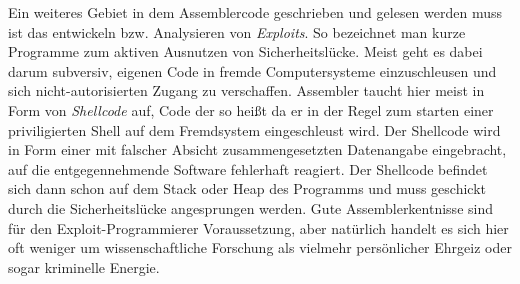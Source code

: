 Ein weiteres Gebiet in dem Assemblercode geschrieben und gelesen werden muss ist das entwickeln bzw. Analysieren von \emph{Exploits}. So bezeichnet man kurze Programme zum aktiven Ausnutzen von Sicherheitslücke. Meist geht es dabei darum subversiv, eigenen Code in fremde Computersysteme einzuschleusen und sich nicht-autorisierten Zugang zu verschaffen. Assembler taucht hier meist in Form von \emph{Shellcode} auf, Code der so heißt da er in der Regel zum starten einer priviligierten Shell auf dem Fremdsystem eingeschleust wird. Der Shellcode wird in Form einer mit falscher Absicht zusammengesetzten Datenangabe eingebracht, auf die entgegennehmende Software fehlerhaft reagiert. Der Shellcode befindet sich dann schon auf dem Stack oder Heap des Programms und muss geschickt durch die Sicherheitslücke angesprungen werden. Gute Assemblerkentnisse sind für den Exploit-Programmierer Voraussetzung, aber natürlich handelt es sich hier oft weniger um wissenschaftliche Forschung als vielmehr persönlicher Ehrgeiz oder sogar kriminelle Energie.
